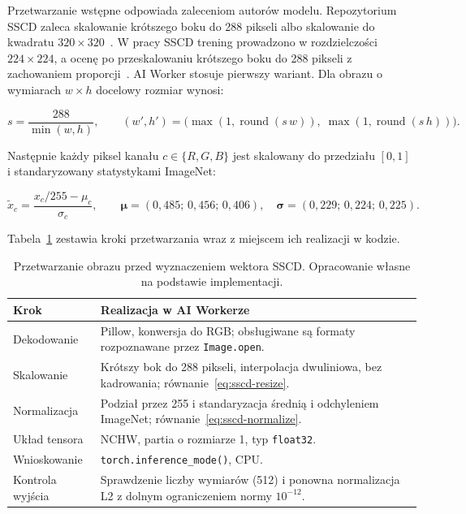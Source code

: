 Przetwarzanie wstępne odpowiada zaleceniom autorów modelu.
Repozytorium SSCD zaleca skalowanie krótszego boku do 288 pikseli
albo skalowanie do kwadratu \(320\times320\)~\cite{sscd_repo}.
W pracy SSCD trening prowadzono w rozdzielczości \(224\times224\),
a ocenę po przeskalowaniu krótszego boku do 288 pikseli z zachowaniem
proporcji~\cite{pizzi2022sscd}. AI Worker stosuje pierwszy wariant.
Dla obrazu o wymiarach \(w\times h\) docelowy rozmiar wynosi:

\begin{equation}
\label{eq:sscd-resize}
s=\frac{288}{\min(w,h)},\qquad
(w',h')=\bigl(\max(1,\operatorname{round}(s\,w)),\;
\max(1,\operatorname{round}(s\,h))\bigr).
\end{equation}

Następnie każdy piksel kanału \(c\in\{R,G,B\}\) jest skalowany do
przedziału \([0,1]\) i standaryzowany statystykami ImageNet:

\begin{equation}
\label{eq:sscd-normalize}
\tilde{x}_c=\frac{x_c/255-\mu_c}{\sigma_c},\qquad
\boldsymbol{\mu}=(0{,}485;\,0{,}456;\,0{,}406),\quad
\boldsymbol{\sigma}=(0{,}229;\,0{,}224;\,0{,}225).
\end{equation}

Tabela~\ref{tab:sscd-preprocessing} zestawia kroki przetwarzania
wraz z miejscem ich realizacji w kodzie.

\begin{table}[!htbp]
\centering
\caption{Przetwarzanie obrazu przed wyznaczeniem wektora SSCD.
Opracowanie własne na podstawie implementacji.}
\label{tab:sscd-preprocessing}
\begin{tabular}{|p{}|p{}|}
\hline
\textbf{Krok} & \textbf{Realizacja w AI Workerze} \\
\hline
Dekodowanie & Pillow, konwersja do RGB; obsługiwane są formaty
rozpoznawane przez \texttt{Image.open}. \\
\hline
Skalowanie & Krótszy bok do 288 pikseli, interpolacja dwuliniowa,
bez kadrowania; równanie~\eqref{eq:sscd-resize}. \\
\hline
Normalizacja & Podział przez 255 i standaryzacja średnią i odchyleniem
ImageNet; równanie~\eqref{eq:sscd-normalize}. \\
\hline
Układ tensora & NCHW, partia o rozmiarze 1, typ \texttt{float32}. \\
\hline
Wnioskowanie & \texttt{torch.inference\_mode()}, CPU. \\
\hline
Kontrola wyjścia & Sprawdzenie liczby wymiarów (512) i ponowna
normalizacja L2 z dolnym ograniczeniem normy \(10^{-12}\). \\
\hline
\end{tabular}
\end{table}

